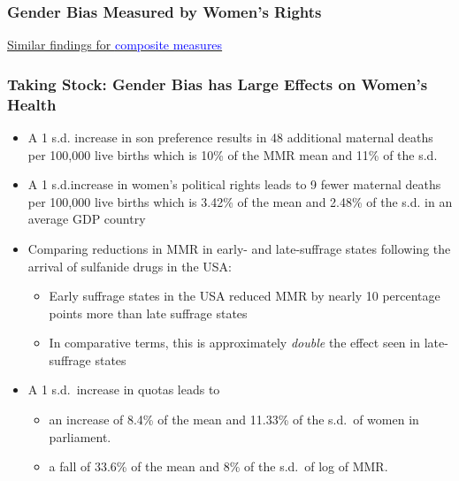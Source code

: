 \documentclass[10pt,letterpaper,subeqn]{beamer}
\begin{document}
\begin{frame}[label=Rights]
\frametitle{Gender Bias Measured by  Women's Rights}

\hyperlink{RightsComp}{Similar findings for \textcolor{blue}{composite measures}}
\end{frame}


\begin{frame}
\frametitle{Taking Stock: Gender Bias has Large Effects on Women's Health}
\begin{itemize}
	\item A 1 s.d. increase in son preference results in 48 additional maternal deaths per 100,000 live births which is 10\% of the MMR mean and 11\% of the s.d.
		\item A 1 s.d.increase in women's political rights leads to 9 fewer maternal deaths per 100,000 live births which is 3.42\% of the mean and 2.48\% of the s.d. in an average GDP country
	\item Comparing reductions in MMR in early- and late-suffrage states following the arrival of sulfanide drugs in the USA:
		
\begin{itemize}
		\item Early suffrage states in the USA reduced MMR by nearly 10 percentage points more than late suffrage states
		\item In comparative terms, this is approximately \emph{double} the effect seen in late-suffrage states
\end{itemize}

		\item A 1 s.d.\ increase in quotas leads to
		\begin{itemize}
		\item an increase of 8.4\% of the mean and 11.33\% of the s.d.\ of women in parliament.
		\item a fall of 33.6\% of the mean and 8\% of the s.d.\ of log of MMR.
\end{itemize}
\end{itemize}
\end{frame}


\end{document}
